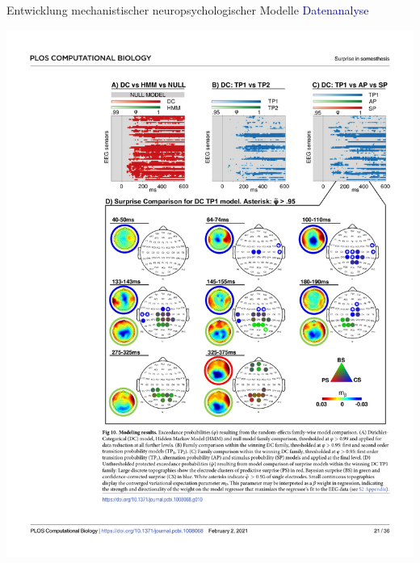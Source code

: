 \documentclass[
  8pt,
  ignorenonframetext,
]{beamer}
\begin{document}
\begin{frame}{Entwicklung mechanistischer neuropsychologischer Modelle}
\protect\hypertarget{entwicklung-mechanistischer-neuropsychologischer-modelle-5}{}
\textcolor{darkblue}{Datenanalyse} \vspace{2mm}

\begin{center}\includegraphics[width=0.9\linewidth]{2_Abbildungen/pfm_2_gijsen_datenanalyse_1} \end{center}


\end{frame}
\end{document}
